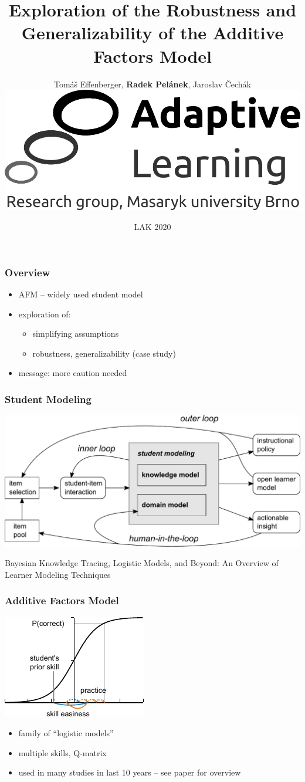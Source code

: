 \documentclass[bigger]{beamer}
\title{Exploration of the Robustness and Generalizability of the Additive Factors Model}
\author{Tom{\'a}{\v{s}} Effenberger, \textbf{Radek Pel\'anek}, Jaroslav \v{C}ech\'ak\\[10mm]
\includegraphics[width=.3\linewidth]{al-logo}
}
\date{LAK 2020}
\begin{document}
\frame{\titlepage}

\begin{frame}
  \frametitle{Overview}

  \begin{itemize}
  \item AFM -- widely used student model
  \item exploration of:
    \begin{itemize}
    \item simplifying assumptions
    \item robustness, generalizability (case study)
    \end{itemize}
  \item message: more caution needed
  \end{itemize}
\end{frame}

\begin{frame}
  \frametitle{Student Modeling}

  \begin{center}
    \includegraphics[width=\linewidth]{learner-modeling-context.pdf}
  \end{center}

  \bigskip
  \begin{flushright}
    {\tiny Bayesian Knowledge Tracing, Logistic Models, and Beyond: An Overview of Learner Modeling Techniques}
  \end{flushright}
\end{frame}

\begin{frame}
  \frametitle{Additive Factors Model}

  \begin{center}
    \includegraphics[width=.4\linewidth]{afm-illustration}
  \end{center}

  \begin{itemize}
  \item family of ``logistic models''
  \item multiple skills, Q-matrix
  \item used in many studies in last 10 years -- see paper for overview
  \end{itemize}
\end{frame}
\end{document}
